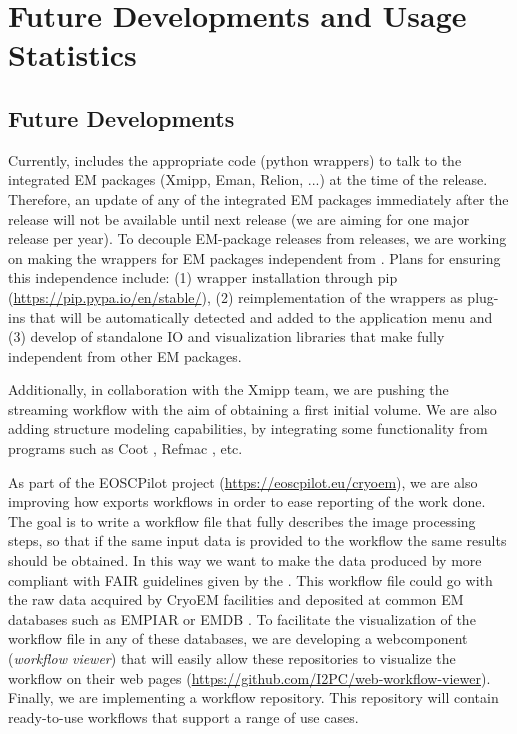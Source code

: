 \section{Future Developments and Usage Statistics}

\subsection{Future Developments}
Currently, \scipion includes the appropriate code (python wrappers) to talk to the integrated EM packages (Xmipp, Eman, Relion, ...) at the time of the release. Therefore, an update of any of the integrated EM packages immediately after the \scipion release will not be available until next \scipion release (we are aiming for one major release per year). To decouple EM-package releases from \scipion releases, we are working on making the wrappers for EM packages  independent from \scipion. Plans for ensuring this independence include: (1) wrapper installation through pip (\url{https://pip.pypa.io/en/stable/}), (2) reimplementation of the wrappers as plug-ins that will be automatically detected and added to the application menu and (3) develop of standalone IO  and visualization libraries that make \scipion fully independent from other EM packages.

Additionally, in collaboration with the Xmipp team, we are pushing the streaming workflow with the aim of obtaining a first initial volume. We are also adding structure modeling capabilities, by integrating some functionality from programs such as Coot \citep{emsley2010:coot}, Refmac \citep{Murshudov1997:refmac}, etc. 

As part of the EOSCPilot project (\url{https://eoscpilot.eu/cryoem}), we are also improving  how \scipion exports workflows in order to ease reporting of the work done. The goal is to write a workflow file that fully describes the image processing steps, so that if the same input data is provided to the workflow the same results should be obtained. In this way we want to make  the data produced by \scipion more compliant with FAIR guidelines given by the \citet{eu2016:fair}. This workflow file could go with the raw data acquired by CryoEM facilities and deposited at common EM databases such as EMPIAR or EMDB \citep{Patwardhan2016:databasesEM}. To facilitate the visualization of the workflow file in any of these databases, we are  developing a  webcomponent (\scipion \emph{workflow viewer}) that will easily allow these repositories to visualize the workflow on their web pages (\url{https://github.com/I2PC/web-workflow-viewer}). Finally, we are implementing a workflow repository. This repository will contain ready-to-use workflows that support a range of use cases.

